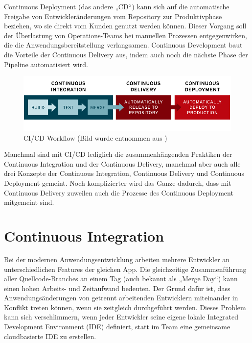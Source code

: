 Continuous Deployment (das andere „CD“) kann sich auf die automatische Freigabe von Entwickleränderungen vom Repository zur Produktivphase beziehen, wo sie direkt vom Kunden genutzt werden können. Dieser Vorgang soll der Überlastung von Operations-Teams bei manuellen Prozessen entgegenwirken, die die Anwendungsbereitstellung verlangsamen. Continuous Development baut die Vorteile der Continuous Delivery aus, indem auch noch die nächste Phase der Pipeline automatisiert wird.\autocite{whatIsCICD}

\begin{figure}[H]
	\centerline{
		\includegraphics[width=1\textwidth, frame]{./grafiken/ci-cd-flow-redhatsource.png}
	}
	\vskip0pt
	\caption{CI/CD Workflow (Bild wurde entnommen aus \cite{whatIsCICD})}
\end{figure}


Manchmal sind mit CI/CD lediglich die zusammenhängenden Praktiken der Continuous Integration und der Continuous Delivery, manchmal aber auch alle drei Konzepte der Continuous Integration, Continuous Delivery und Continuous Deployment gemeint. Noch komplizierter wird das Ganze dadurch, dass mit Continuous Delivery zuweilen auch die Prozesse des Continuous Deployment mitgemeint sind.\autocite{whatIsCICD}

\section{Continuous Integration}

Bei der modernen Anwendungsentwicklung arbeiten mehrere Entwickler an unterschiedlichen Features der gleichen App. Die gleichzeitige Zusammenführung aller Quellcode-Branches an einem Tag (auch bekannt als „Merge Day“) kann einen hohen Arbeits- und Zeitaufwand bedeuten. Der Grund dafür ist, dass Anwendungsänderungen von getrennt arbeitenden Entwicklern miteinander in Konflikt treten können, wenn sie zeitgleich durchgeführt werden. Dieses Problem kann sich verschlimmern, wenn jeder Entwickler seine eigene lokale Integrated Development Environment (IDE) definiert, statt im Team eine gemeinsame cloudbasierte IDE zu erstellen.\autocite{whatIsCICD}

